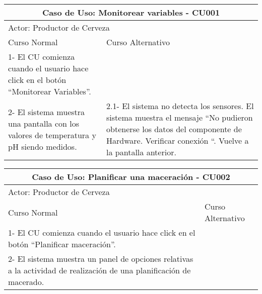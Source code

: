     \begin{minipage}{0.95\textwidth}
    \begin{center}
    \begin{tabularx}{\textwidth}{ | X | X |}
        \hline
        \multicolumn{2}{|c|}{\textbf{Caso de Uso: Monitorear variables - CU001}} \\
        \hline
        \multicolumn{2}{|l|}{Actor: Productor de Cerveza} \\
        \hline
        Curso Normal & Curso Alternativo \\
        \hline
        1- El CU comienza cuando el usuario hace click en el botón “Monitorear Variables”. & \\
        \hline
        2- El sistema muestra una pantalla con los valores de temperatura y pH siendo medidos. & 2.1- El sistema no detecta los sensores. 
        El sistema muestra el mensaje “No pudieron obtenerse los datos del componente de Hardware. Verificar conexión “. Vuelve a la pantalla anterior.
        \\
        \hline
    \end{tabularx}
    \label{CU001}
    \end{center}
    \end{minipage}
    
    
    \begin{minipage}{0.95\textwidth}
    \begin{center}
    \begin{tabularx}{\textwidth}{ | X | X |}
        \hline
        \multicolumn{2}{|c|}{\textbf{Caso de Uso: Planificar una maceración - CU002}} \\
        \hline
        \multicolumn{2}{|l|}{Actor: Productor de Cerveza} \\
        \hline
        Curso Normal & Curso Alternativo \\
        \hline
        1- El CU comienza cuando el usuario hace click en el botón “Planificar maceración”. & \\
        \hline
        2- El sistema muestra un panel de opciones relativas a la actividad de realización de una planificación de macerado. & 
        \\
        \hline
    \end{tabularx}
    \label{CU002}
    \end{center}
    \end{minipage}
    
